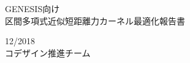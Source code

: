 \documentclass[uplatex,11pt,a4j,titlepage,oneside,openright,dvipdfmx]{jsbook}
\begin{document}
\setlength{\baselineskip}{16pt}
\frontmatter

 \thispagestyle{empty}

\begin{center}
   \vspace{8.0cm}
    {\LARGE  GENESIS向け\\区間多項式近似短距離力カーネル最適化報告書}\\
   \vspace{3mm}

 \vspace{10.0cm}
 {\Large 12/2018} \\
 \vspace{3.5cm}
 {\LARGE コデザイン推進チーム} \\
 \vspace{1.5cm}
\end{center}
\newpage
\thispagestyle{empty}

\mbox{}\newpage
\end{document}
